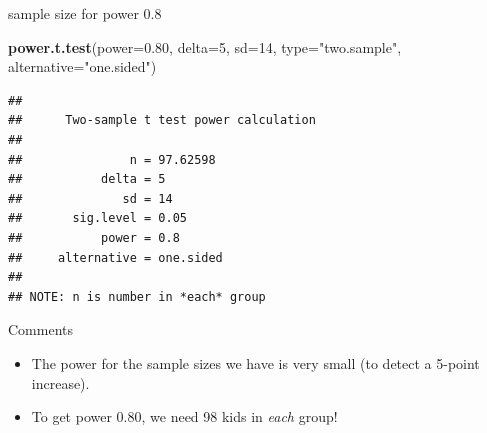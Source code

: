 \documentclass[
  ignorenonframetext,
]{beamer}
\newenvironment{Shaded}{\begin{snugshade}}{\end{snugshade}}
\newcommand{\DataTypeTok}[1]{\textcolor[rgb]{0.13,0.29,0.53}{#1}}
\newcommand{\DecValTok}[1]{\textcolor[rgb]{0.00,0.00,0.81}{#1}}
\newcommand{\FloatTok}[1]{\textcolor[rgb]{0.00,0.00,0.81}{#1}}
\newcommand{\KeywordTok}[1]{\textcolor[rgb]{0.13,0.29,0.53}{\textbf{#1}}}
\newcommand{\NormalTok}[1]{#1}
\newcommand{\StringTok}[1]{\textcolor[rgb]{0.31,0.60,0.02}{#1}}
\providecommand{\tightlist}{%
  \setlength{\itemsep}{0pt}\setlength{\parskip}{0pt}}
\begin{document}
\begin{frame}[fragile]{sample size for power 0.8}
\protect\hypertarget{sample-size-for-power-0.8}{}

\begin{Shaded}
\begin{Highlighting}[]
\KeywordTok{power.t.test}\NormalTok{(}\DataTypeTok{power=}\FloatTok{0.80}\NormalTok{, }\DataTypeTok{delta=}\DecValTok{5}\NormalTok{, }\DataTypeTok{sd=}\DecValTok{14}\NormalTok{, }\DataTypeTok{type=}\StringTok{"two.sample"}\NormalTok{, }
             \DataTypeTok{alternative=}\StringTok{"one.sided"}\NormalTok{)}
\end{Highlighting}
\end{Shaded}

\begin{verbatim}
## 
##      Two-sample t test power calculation 
## 
##               n = 97.62598
##           delta = 5
##              sd = 14
##       sig.level = 0.05
##           power = 0.8
##     alternative = one.sided
## 
## NOTE: n is number in *each* group
\end{verbatim}

\end{frame}

\begin{frame}{Comments}
\protect\hypertarget{comments-4}{}

\begin{itemize}
\tightlist
\item
  The power for the sample sizes we have is very small (to detect a
  5-point increase).
\item
  To get power 0.80, we need 98 kids in \emph{each} group!
\end{itemize}

\end{frame}
\end{document}
